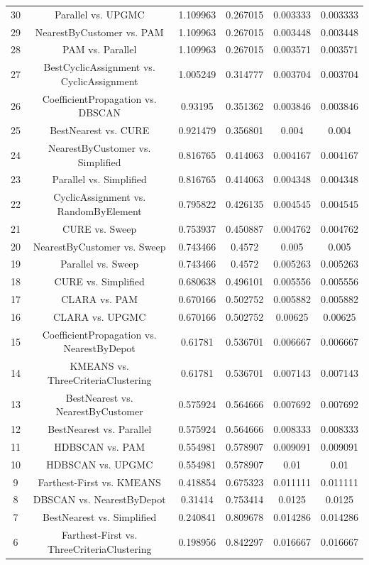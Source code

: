 \documentclass[a4paper,10pt]{article}
\begin{document}
\begin{landscape}
\begin{table}[!htp]
\begin{tabular}{cccccc}
30&Parallel vs. UPGMC&1.109963&0.267015&0.003333&0.003333\\
29&NearestByCustomer vs. PAM&1.109963&0.267015&0.003448&0.003448\\
28&PAM vs. Parallel&1.109963&0.267015&0.003571&0.003571\\
27&BestCyclicAssignment vs. CyclicAssignment&1.005249&0.314777&0.003704&0.003704\\
26&CoefficientPropagation vs. DBSCAN&0.93195&0.351362&0.003846&0.003846\\
25&BestNearest vs. CURE&0.921479&0.356801&0.004&0.004\\
24&NearestByCustomer vs. Simplified&0.816765&0.414063&0.004167&0.004167\\
23&Parallel vs. Simplified&0.816765&0.414063&0.004348&0.004348\\
22&CyclicAssignment vs. RandomByElement&0.795822&0.426135&0.004545&0.004545\\
21&CURE vs. Sweep&0.753937&0.450887&0.004762&0.004762\\
20&NearestByCustomer vs. Sweep&0.743466&0.4572&0.005&0.005\\
19&Parallel vs. Sweep&0.743466&0.4572&0.005263&0.005263\\
18&CURE vs. Simplified&0.680638&0.496101&0.005556&0.005556\\
17&CLARA vs. PAM&0.670166&0.502752&0.005882&0.005882\\
16&CLARA vs. UPGMC&0.670166&0.502752&0.00625&0.00625\\
15&CoefficientPropagation vs. NearestByDepot&0.61781&0.536701&0.006667&0.006667\\
14&KMEANS vs. ThreeCriteriaClustering&0.61781&0.536701&0.007143&0.007143\\
13&BestNearest vs. NearestByCustomer&0.575924&0.564666&0.007692&0.007692\\
12&BestNearest vs. Parallel&0.575924&0.564666&0.008333&0.008333\\
11&HDBSCAN vs. PAM&0.554981&0.578907&0.009091&0.009091\\
10&HDBSCAN vs. UPGMC&0.554981&0.578907&0.01&0.01\\
9&Farthest-First vs. KMEANS&0.418854&0.675323&0.011111&0.011111\\
8&DBSCAN vs. NearestByDepot&0.31414&0.753414&0.0125&0.0125\\
7&BestNearest vs. Simplified&0.240841&0.809678&0.014286&0.014286\\
6&Farthest-First vs. ThreeCriteriaClustering&0.198956&0.842297&0.016667&0.016667\\

\end{tabular}
\end{table}
\end{landscape}
\end{document}
